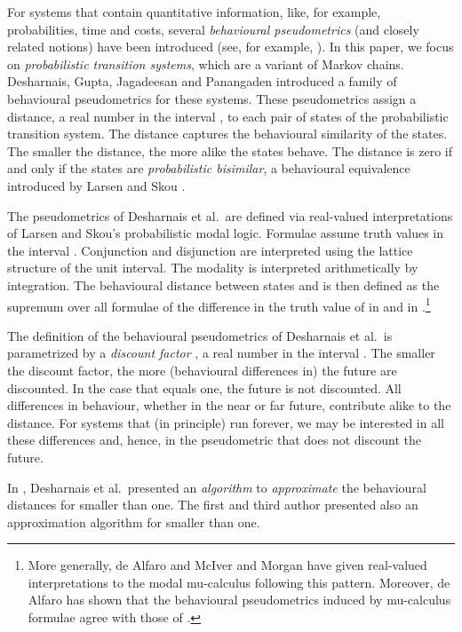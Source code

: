 \documentclass{LMCS}
\begin{document}
For systems that contain quantitative information, like, for example, 
probabilities, time and costs, several {\em behavioural pseudometrics\/} 
(and closely related notions) have been introduced (see, for example, 
\cite{BW05:tcs,B98:dc,CB02:emsoft,AHM03:icalp,DCPP05:qapl,DGJP04:tcs,DHW03:concur,GJS90:ifip,GP05a:dcec,MRST06:tcs,Y02:tcs}).  
In this paper, we focus on {\em probabilistic transition systems},
which are a variant of Markov chains.
Desharnais, Gupta, Jagadeesan and Panangaden \cite{DGJP04:tcs}
introduced a family of behavioural pseudometrics for these systems.  
These pseudometrics assign a distance, a real number in the interval ,
to each pair of states of the probabilistic transition system.
The distance captures the behavioural similarity of the states.
The smaller the distance, the more alike the states behave.  The
distance is zero if and only if the states are {\em probabilistic bisimilar}, a
behavioural equivalence introduced by Larsen and Skou \cite{LS91:ic}.

The pseudometrics of Desharnais et al.\ are defined via real-valued 
interpretations of Larsen and Skou's probabilistic modal logic.  Formulae 
assume truth values in the interval .  Conjunction and disjunction 
are interpreted using the lattice structure of the unit interval.  The 
modality  is interpreted arithmetically by integration.  The behavioural 
distance between states  and  is then defined as the supremum over 
all formulae  of the difference in the truth value of  in 
 and in .\footnote{More generally, de Alfaro \cite{A03:concur} and McIver and
Morgan \cite{MM:tocl} 
have given real-valued interpretations to the modal mu-calculus following 
this pattern.  Moreover, de Alfaro has shown that the behavioural 
pseudometrics induced by mu-calculus formulae agree with those of 
\cite{DGJP04:tcs}.}

The definition of the behavioural pseudometrics of Desharnais et al.\
is para\-metrized by a {\em discount factor\/} , a real number in the
interval .  The smaller the discount factor, the more (behavioural
differences in) the future are discounted.  In the case that 
equals one, the future is not discounted.  All differences in behaviour,
whether in the near or far future, contribute alike to the distance.
For systems that (in principle) run forever, we may be interested in all
these differences and, hence, in the pseudometric that does not discount
the future.

In \cite{DGJP99:concur}, Desharnais et al.\ presented an {\em algorithm\/} to
{\em approximate\/} the behavioural distances for  smaller than one.
The first and third author \cite{BW06:tcs} presented also an
approximation algorithm for  smaller than one.
\end{document}

